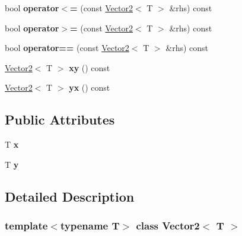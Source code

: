 \begin{DoxyCompactItemize}
\item 
\mbox{\label{class_vector2_a0a798a144b107a4a7964da13c1ada290}} 
bool {\bfseries operator$<$=} (const \mbox{\hyperlink{class_vector2}{Vector2}}$<$ T $>$ \&rhs) const
\item 
\mbox{\label{class_vector2_aad131ea8361750d0fd577c268ed45cc6}} 
bool {\bfseries operator$>$=} (const \mbox{\hyperlink{class_vector2}{Vector2}}$<$ T $>$ \&rhs) const
\item 
\mbox{\label{class_vector2_a45c07c01d5704a8f7e9b55077034e4f8}} 
bool {\bfseries operator==} (const \mbox{\hyperlink{class_vector2}{Vector2}}$<$ T $>$ \&rhs) const
\item 
\mbox{\label{class_vector2_a318be8911fa2fbb1887f95196d26c6e8}} 
\mbox{\hyperlink{class_vector2}{Vector2}}$<$ T $>$ {\bfseries xy} () const
\item 
\mbox{\label{class_vector2_a45bce734de6f2bc8fc9f0ca6a8bad7a1}} 
\mbox{\hyperlink{class_vector2}{Vector2}}$<$ T $>$ {\bfseries yx} () const
\end{DoxyCompactItemize}
\subsection*{Public Attributes}
\begin{DoxyCompactItemize}
\item 
\mbox{\label{class_vector2_a78fa1f2ed5e261c7fbeb8f3536a1ee34}} 
T {\bfseries x}
\item 
\mbox{\label{class_vector2_a6cfed8355591aa269f4dba43bd806ef9}} 
T {\bfseries y}
\end{DoxyCompactItemize}


\subsection{Detailed Description}
\subsubsection*{template$<$typename T$>$\newline
class Vector2$<$ T $>$}

